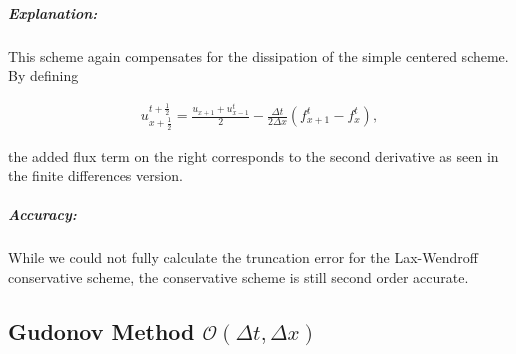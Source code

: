 \documentclass[11pt]{article}
\begin{document}
    \subparagraph{Explanation:}\label{explanation}

This scheme again compensates for the dissipation of the simple centered
scheme. By defining

\begin{align}
    u_{x+\frac{1}{2}}^{t+\frac{1}{2}} = \frac{u_{x+1} + u_{x-1}^t}{2} - \frac{\Delta t}{2\Delta x}(f_{x+1}^t - f_x^t), 
\end{align}

the added flux term on the right corresponds to the second derivative as
seen in the finite differences version.

\subparagraph{Accuracy:}\label{accuracy}

While we could not fully calculate the truncation error for the
Lax-Wendroff conservative scheme, the conservative scheme is still
second order accurate.

    \subsection{\texorpdfstring{Gudonov Method
\(\mathcal{O}(\Delta t, \Delta x)\)}{Gudonov Method \textbackslash{}mathcal\{O\}(\textbackslash{}Delta t, \textbackslash{}Delta x)}}\label{gudonov-method-mathcalodelta-t-delta-x}
\end{document}
